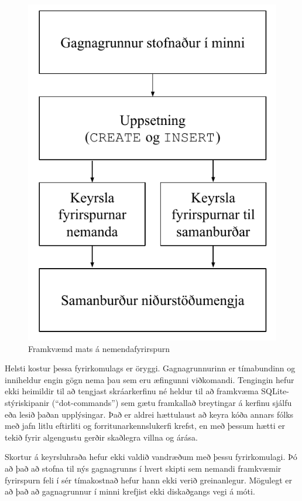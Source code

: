 \documentclass[a4paper,12pt,twoside,BCOR=10mm]{scrbook}
\begin{document}
\begin{figure}
\caption{Framkvæmd mats á nemendafyrirspurn}
\label{fig:sql-evaluation-execution}
\begin{center}
\includegraphics{KeyrslaFyrirspurnar}
\end{center}
\end{figure}

Helsti kostur þessa fyrirkomulags er öryggi. Gagnagrunnurinn er tímabundinn og inniheldur engin gögn nema þau sem eru æfingunni viðkomandi. Tengingin hefur ekki heimildir til að tengjast skráarkerfinu né heldur til að framkvæma SQLite-stýriskipanir (``dot-commands'') sem gætu framkallað breytingar á kerfinu sjálfu eða lesið þaðan upplýsingar. Það er aldrei hættulaust að keyra kóða annars fólks með jafn litlu eftirliti og forritunarkennslukerfi krefst, en með þessum hætti er tekið fyrir algengustu gerðir skaðlegra villna og árása.

Skortur á keyrsluhraða hefur ekki valdið vandræðum með þessu fyrirkomulagi. Þó að það að stofna til nýs gagnagrunns í hvert skipti sem nemandi framkvæmir fyrirspurn feli í sér tímakostnað hefur hann ekki verið greinanlegur. Mögulegt er að það að gagnagrunnur í minni krefjist ekki diskaðgangs vegi á móti.
\end{document}

